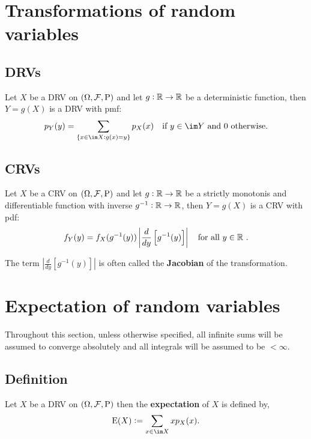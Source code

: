 \documentclass[../Year1/Year1.tex]{subfiles}
\begin{document}
\section{Transformations of random variables}
\subsection{DRVs}
\begingroup\belowdisplayskip=-10pt
\begin{theorem}
    Let $X$ be a DRV on $(\Omega,\mathcal{F},\mathrm{P})$ and let $g:\mathbb{R}\rightarrow\mathbb{R}$ be a deterministic function, then $Y=g(X)$ is a DRV with pmf: \[
    p_Y(y)=\sum_{\{x\in\im X:g(x)=y\}}p_X(x) \quad \text{\textcolor{black}{if }$y\in\im Y$ \textcolor{black}{and }0 \textcolor{black}{ otherwise.}}
    \]
\end{theorem}
\endgroup
\subsection{CRVs}
\begingroup\belowdisplayskip=-10pt
\begin{theorem}
    Let $X$ be a CRV on $(\Omega,\mathcal{F},\mathrm{P})$ and let $g:\mathbb{R}\rightarrow\mathbb{R}$ be a strictly monotonis and differentiable function with inverse $g^{-1}:\mathbb{R}\rightarrow\mathbb{R}$, then $Y=g(X)$ is a CRV with pdf: \[
    f_Y(y)=f_X(g^{-1}(y))\left|\frac{d}{dy}\left[g^{-1}(y)\right]\right| \quad \text{\textcolor{black}{for all }$y\in\mathbb{R}$ \textcolor{black}{.}}
    \]
\end{theorem}
\endgroup
\begin{remark}
    The term ${\displaystyle\left|\frac{d}{dy}\left[g^{-1}(y)\right]\right|}$ is often called the \textbf{Jacobian} of the transformation.
\end{remark}
\section{Expectation of random variables}
Throughout this section, unless otherwise specified, all infinite sums will be assumed to converge absolutely and all integrals will be assumed to be $<\infty$.
\subsection{Definition}

\begingroup\belowdisplayskip=-10pt
\begin{definition}
    Let $X$ be a DRV on $(\Omega,\mathcal{F},\mathrm{P})$ then the \textbf{expectation} of $X$ is defined by, \[
        \E(X) := \sum_{x\in\im X}xp_X(x) \textcolor{black}{.}
    \]
\end{definition}
\endgroup
\end{document}
